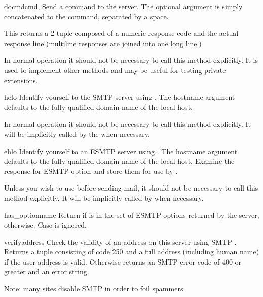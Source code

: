 \begin{methoddesc}{docmd}{cmd, }
Send a command  to the server.  The optional argument
 is simply concatenated to the command, separated by a
space.

This returns a 2-tuple composed of a numeric response code and the
actual response line (multiline responses are joined into one long
line.)

In normal operation it should not be necessary to call this method
explicitly.  It is used to implement other methods and may be useful
for testing private extensions.
\end{methoddesc}

\begin{methoddesc}{helo}{}
Identify yourself to the SMTP server using .  The hostname
argument defaults to the fully qualified domain name of the local
host.

In normal operation it should not be necessary to call this method
explicitly.  It will be implicitly called by the 
when necessary.
\end{methoddesc}

\begin{methoddesc}{ehlo}{}
Identify yourself to an ESMTP server using .  The hostname
argument defaults to the fully qualified domain name of the local
host.  Examine the response for ESMTP option and store them for use by
.

Unless you wish to use  before sending
mail, it should not be necessary to call this method explicitly.  It
will be implicitly called by  when necessary.
\end{methoddesc}

\begin{methoddesc}{has_option}{name}
Return  if  is in the set of ESMTP options returned
by the server,  otherwise.  Case is ignored.
\end{methoddesc}

\begin{methoddesc}{verify}{address}
Check the validity of an address on this server using SMTP .
Returns a tuple consisting of code 250 and a full  address
(including human name) if the user address is valid. Otherwise returns
an SMTP error code of 400 or greater and an error string.

Note: many sites disable SMTP  in order to foil spammers.
\end{methoddesc}

